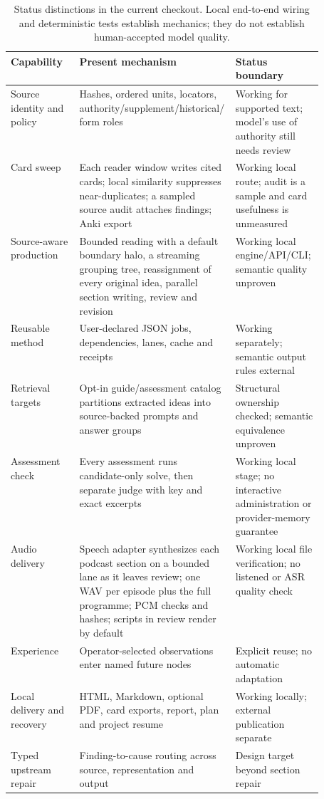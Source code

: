 \documentclass[11pt,letterpaper]{article}
\begin{document}
\begin{table}[H]
\centering
\small
\begin{tabularx}{\linewidth}{@{}>{\raggedright\arraybackslash}p{0.22\linewidth}>{\raggedright\arraybackslash}X>{\raggedright\arraybackslash}p{0.29\linewidth}@{}}
\toprule
Capability & Present mechanism & Status boundary \\
\midrule
Source identity and policy & Hashes, ordered units, locators, authority/supplement/historical/form roles & Working for supported text; model's use of authority still needs review \\
Card sweep & Each reader window writes cited cards; local similarity suppresses near-duplicates; a sampled source audit attaches findings; Anki export & Working local route; audit is a sample and card usefulness is unmeasured \\
Source-aware production & Bounded reading with a default boundary halo, a streaming grouping tree, reassignment of every original idea, parallel section writing, review and revision & Working local engine/API/CLI; semantic quality unproven \\
Reusable method & User-declared JSON jobs, dependencies, lanes, cache and receipts & Working separately; semantic output rules external \\
Retrieval targets & Opt-in guide/assessment catalog partitions extracted ideas into source-backed prompts and answer groups & Structural ownership checked; semantic equivalence unproven \\
Assessment check & Every assessment runs candidate-only solve, then separate judge with key and exact excerpts & Working local stage; no interactive administration or provider-memory guarantee \\
Audio delivery & Speech adapter synthesizes each podcast section on a bounded lane as it leaves review; one WAV per episode plus the full programme; PCM checks and hashes; scripts in review render by default & Working local file verification; no listened or ASR quality check \\
Experience & Operator-selected observations enter named future nodes & Explicit reuse; no automatic adaptation \\
Local delivery and recovery & HTML, Markdown, optional PDF, card exports, report, plan and project resume & Working locally; external publication separate \\
Typed upstream repair & Finding-to-cause routing across source, representation and output & Design target beyond section repair \\
\bottomrule
\end{tabularx}
\caption{Status distinctions in the current checkout. Local end-to-end wiring and deterministic tests establish mechanics; they do not establish human-accepted model quality.}
\label{tab:status}
\end{table}
\end{document}
